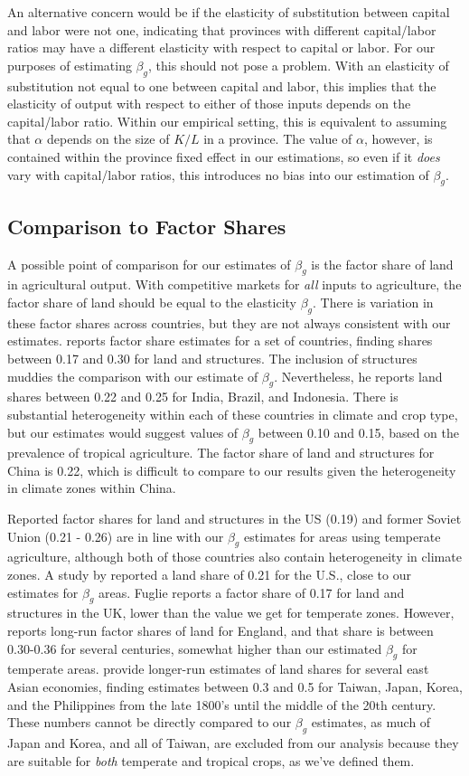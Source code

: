 \documentclass[11pt]{article}
\begin{document}
An alternative concern would be if the elasticity of substitution between capital and labor were not one, indicating that provinces with different capital/labor ratios may have a different elasticity with respect to capital or labor. For our purposes of estimating $\beta_g$, this should not pose a problem. With an elasticity of substitution not equal to one between capital and labor, this implies that the elasticity of output with respect to either of those inputs depends on the capital/labor ratio. Within our empirical setting, this is equivalent to assuming that $\alpha$ depends on the size of $K/L$ in a province. The value of $\alpha$, however, is contained within the province fixed effect in our estimations, so even if it \textit{does} vary with capital/labor ratios, this introduces no bias into our estimation of $\beta_g$.

\subsection{Comparison to Factor Shares}
A possible point of comparison for our estimates of $\beta_g$ is the factor share of land in agricultural output. With competitive markets for \textit{all} inputs to agriculture, the factor share of land should be equal to the elasticity $\beta_g$. There is variation in these factor shares across countries, but they are not always consistent with our estimates. \citet{fuglie2010} reports factor share estimates for a set of countries, finding shares between 0.17 and 0.30 for land and structures. The inclusion of structures muddies the comparison with our estimate of $\beta_g$. Nevertheless, he reports land shares between 0.22 and 0.25 for India, Brazil, and Indonesia. There is substantial heterogeneity within each of these countries in climate and crop type, but our estimates would suggest values of $\beta_g$ between 0.10 and 0.15, based on the prevalence of tropical agriculture. The factor share of land and structures for China is 0.22, which is difficult to compare to our results given the heterogeneity in climate zones within China.

Reported factor shares for land and structures in the US (0.19) and former Soviet Union (0.21 - 0.26) are in line with our $\beta_g$ estimates for areas using temperate agriculture, although both of those countries also contain heterogeneity in climate zones. A study by \citet{jg1992} reported a land share of 0.21 for the U.S., close to our estimates for $\beta_g$ areas. Fuglie reports a factor share of 0.17 for land and structures in the UK, lower than the value we get for temperate zones. However, \citet{Clark2002} reports long-run factor shares of land for England, and that share is between 0.30-0.36 for several centuries, somewhat higher than our estimated $\beta_g$ for temperate areas. \citet{hrs1979} provide longer-run estimates of land shares for several east Asian economies, finding estimates between 0.3 and 0.5 for Taiwan, Japan, Korea, and the Philippines from the late 1800's until the middle of the 20th century. These numbers cannot be directly compared to our $\beta_g$ estimates, as much of Japan and Korea, and all of Taiwan, are excluded from our analysis because they are suitable for \textit{both} temperate and tropical crops, as we've defined them. 
\end{document}
